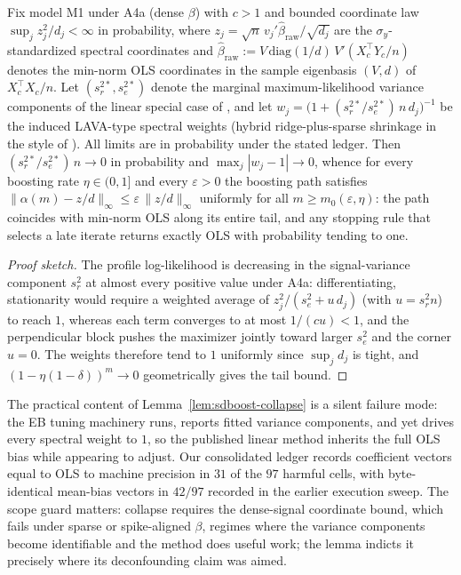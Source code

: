 \begin{lemma}
\label{lem:sdboost-collapse}
Fix model M1 under A4a (dense $\beta$) with $c>1$ and bounded coordinate law $\sup_j z_j^2/d_j < \infty$ in probability, where $z_j = \sqrt{n}\,v_j'\hat\beta_{\mathrm{raw}}/\sqrt{d_j}$ are the $\sigma_y$-standardized spectral coordinates and $\hat\beta_{\mathrm{raw}} := V\,\mathrm{diag}(1/d)\,V'(X_c^\top Y_c/n)$ denotes the min-norm OLS coordinates in the sample eigenbasis $(V,d)$ of $X_c^\top X_c/n$. Let $(s_r^{2*}, s_e^{2*})$ denote the marginal maximum-likelihood variance components of the linear special case of \citet{nava2026sdboost}, and let $w_j = \bigl(1 + (s_r^{2*}/s_e^{2*})\, n\, d_j\bigr)^{-1}$ be the induced LAVA-type spectral weights (hybrid ridge-plus-sparse shrinkage in the style of \citealt{chernozhukov2017high}). All limits are in probability under the stated ledger. Then $(s_r^{2*}/s_e^{2*})\,n \to 0$ in probability and $\max_j |w_j - 1| \to 0$, whence for every boosting rate $\eta \in (0,1]$ and every $\varepsilon>0$ the boosting path satisfies $\|\alpha(m) - z/d\|_\infty \le \varepsilon\,\|z/d\|_\infty$ uniformly for all $m \ge m_0(\varepsilon,\eta)$: the path coincides with min-norm OLS along its entire tail, and any stopping rule that selects a late iterate returns exactly OLS with probability tending to one.
\end{lemma}

\begin{proof}[Proof sketch]
The profile log-likelihood is decreasing in the signal-variance component $s_r^2$ at almost every positive value under A4a: differentiating, stationarity would require a weighted average of $z_j^2/(s_e^2 + u\,d_j)$ (with $u = s_r^2 n$) to reach $1$, whereas each term converges to at most $1/(cu) < 1$, and the perpendicular block pushes the maximizer jointly toward larger $s_e^2$ and the corner $u=0$. The weights therefore tend to $1$ uniformly since $\sup_j d_j$ is tight, and $(1-\eta(1-\delta))^m \to 0$ geometrically gives the tail bound.
\end{proof}

The practical content of Lemma~\ref{lem:sdboost-collapse} is a silent failure mode: the EB tuning machinery runs, reports fitted variance components, and yet drives every spectral weight to $1$, so the published linear method inherits the full OLS bias while appearing to adjust. Our consolidated ledger records coefficient vectors equal to OLS to machine precision in $31$ of the $97$ harmful cells, with byte-identical mean-bias vectors in $42/97$ recorded in the earlier execution sweep. The scope guard matters: collapse requires the dense-signal coordinate bound, which fails under sparse or spike-aligned $\beta$, regimes where the variance components become identifiable and the method does useful work; the lemma indicts it precisely where its deconfounding claim was aimed.

